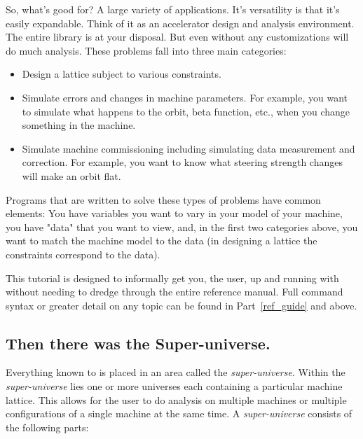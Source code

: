 So, what's \tao good for? A large variety of applications. It's versatility is that
it's easily expandable. Think of it as an accelerator design and analysis
environment. The entire \bmad library is at your disposal. But even without any 
customizations \tao will do much analysis. These problems fall into three main
categories:

\begin{itemize}
\item 
Design a lattice subject to various constraints.
\item
Simulate errors and changes in machine parameters. For example, you want to
simulate what happens to the orbit, beta function, etc., when you change
something in the machine. 
\item 
Simulate machine commissioning including simulating data measurement and
correction. For example, you want to know what steering strength changes will
make an orbit flat.
\end{itemize}

Programs that are written to solve these types of problems have common
elements: You have variables you want to vary in your model of your
machine, you have "data" that you want to view, and, in the first two
categories above, you want to match the machine model to the data (in
designing a lattice the constraints correspond to the data).

This tutorial is designed to informally get you, the user, up and running with \tao without
needing to dredge through the entire reference manual. Full command syntax
or greater detail on any topic can be found in Part~\ref{ref_guide} and above.

\subsection{Then there was the Super-universe.}

Everything known to \tao is placed in an area called the
\textit{super-universe}. Within the \textit{super-universe} lies one or more
universes each containing a particular machine lattice. This allows for the user
to do analysis on multiple machines or multiple configurations of a single
machine at the same time. A \textit{super-universe} consists of the following
parts:

